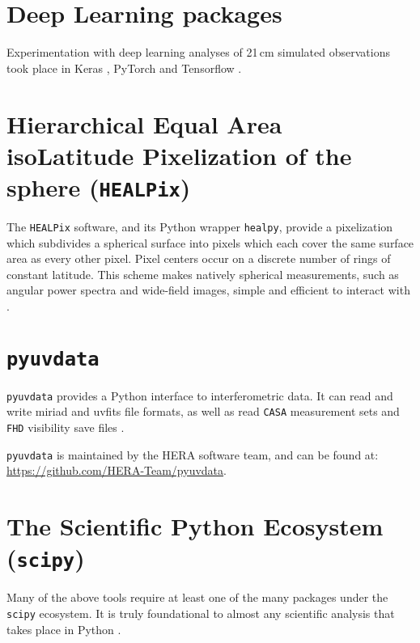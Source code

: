 \section{Deep Learning packages}
\label{sec:keras_pytorch_tf}

Experimentation with deep learning analyses of 21\,cm simulated observations took place in Keras \citep{keras}, PyTorch \citep{pytorch} and Tensorflow \citep{tensorflow}.

\section{Hierarchical Equal Area isoLatitude Pixelization of the sphere ({\tt HEALPix})}
\label{sec:healpix}

The {\tt HEALPix} software, and its Python wrapper {\tt healpy}, provide a pixelization which subdivides a spherical surface into pixels which each cover the same surface area as every other pixel. Pixel centers occur on a discrete number of rings of constant latitude. This scheme makes natively spherical measurements, such as angular power spectra and wide-field images, simple and efficient to interact with \citep{healpix}.

\section{{\tt pyuvdata}}
\label{sec:pyuvdata}

{\tt pyuvdata} provides a Python interface to interferometric data. It can read and write {\sc miriad} and {\sc uvfits} file formats, as well as read {\tt CASA} measurement sets and {\tt FHD} \citep{FHD} visibility save files \citep{pyuvdata}.

{\tt pyuvdata} is maintained by the HERA software team, and can be found at: \url{https://github.com/HERA-Team/pyuvdata}.

\section{The Scientific Python Ecosystem ({\tt scipy})}
\label{sec:scipy}

Many of the above tools require at least one of the many packages under the {\tt scipy} ecosystem. It is truly foundational to almost any scientific analysis that takes place in Python \citep{ScipyEcosystem}.
